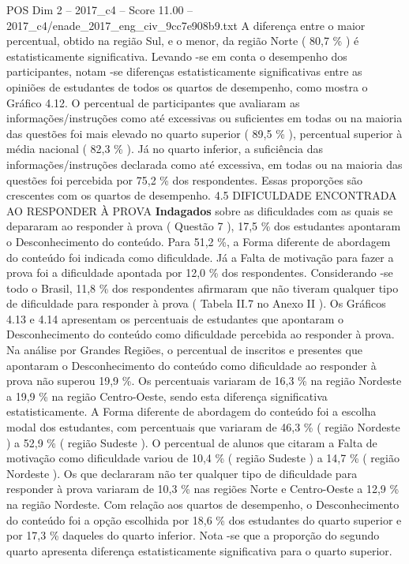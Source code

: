 \begin{textsample}{POS Dim 2 – 2017\_c4 – Score 11.00 – 2017\_c4/enade\_2017\_eng\_civ\_9cc7e908b9.txt}
A diferença entre o maior percentual, obtido na região Sul, e o menor, da região Norte ( 80,7 \% ) é estatisticamente significativa.
Levando -se em conta o desempenho dos participantes, notam -se diferenças estatisticamente significativas entre as opiniões de estudantes de todos os quartos de desempenho, como mostra o Gráfico 4.12.
O percentual de participantes que avaliaram as informações/instruções como até excessivas ou suficientes em todas ou na maioria das questões foi mais elevado no quarto superior ( 89,5 \% ), percentual superior à média nacional ( 82,3 \% ).
Já no quarto inferior, a suficiência das informações/instruções declarada como até excessiva, em todas ou na maioria das questões foi percebida por 75,2 \% dos respondentes.
Essas proporções são crescentes com os quartos de desempenho. 4.5 DIFICULDADE ENCONTRADA AO RESPONDER À PROVA \textbf{Indagados} sobre as dificuldades com as quais se depararam ao responder à prova ( Questão 7 ), 17,5 \% dos estudantes apontaram o Desconhecimento do conteúdo.
Para 51,2 \%, a Forma diferente de abordagem do conteúdo foi indicada como dificuldade.
Já a Falta de motivação para fazer a prova foi a dificuldade apontada por 12,0 \% dos respondentes.
Considerando -se todo o Brasil, 11,8 \% dos respondentes afirmaram que não tiveram qualquer tipo de dificuldade para responder à prova ( Tabela II.7 no Anexo II ).
Os Gráficos 4.13 e 4.14 apresentam os percentuais de estudantes que apontaram o Desconhecimento do conteúdo como dificuldade percebida ao responder à prova.
Na análise por Grandes Regiões, o percentual de inscritos e presentes que apontaram o Desconhecimento do conteúdo como dificuldade ao responder à prova não superou 19,9 \%.
Os percentuais variaram de 16,3 \% na região Nordeste a 19,9 \% na região Centro-Oeste, sendo esta diferença significativa estatisticamente.
A Forma diferente de abordagem do conteúdo foi a escolha modal dos estudantes, com percentuais que variaram de 46,3 \% ( região Nordeste ) a 52,9 \% ( região Sudeste ).
O percentual de alunos que citaram a Falta de motivação como dificuldade variou de 10,4 \% ( região Sudeste ) a 14,7 \% ( região Nordeste ).
Os que declararam não ter qualquer tipo de dificuldade para responder à prova variaram de 10,3 \% nas regiões Norte e Centro-Oeste a 12,9 \% na região Nordeste.
Com relação aos quartos de desempenho, o Desconhecimento do conteúdo foi a opção escolhida por 18,6 \% dos estudantes do quarto superior e por 17,3 \% daqueles do quarto inferior.
Nota -se que a proporção do segundo quarto apresenta diferença estatisticamente significativa para o quarto superior.

\end{textsample}
